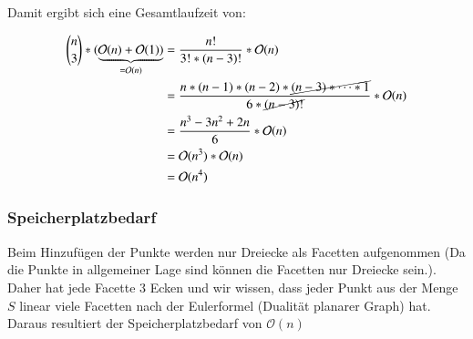 \documentclass[a4paper]{article}
\begin{document}
Damit ergibt sich eine Gesamtlaufzeit von:

\begin{align*}
\binom{n}{3} * (\underbrace{\mathcal{O}(n) + \mathcal{O}(1))}_{= \mathcal{O}(n)} &= 
\frac{n!}{3! * (n-3)!} * \mathcal{O}(n) \\
&= \frac{n * (n-1) * (n-2) * \cancel{(n-3) * \dots * 1}}{6 * \cancel{(n-3)!}} * \mathcal{O}(n) \\
&= \frac{n^3 - 3n^2 + 2n}{6} * \mathcal{O}(n) \\
&= \mathcal{O}(n^3) * \mathcal{O}(n) \\&= \mathcal{O}(n^4)
\end{align*}

\subsubsection*{Speicherplatzbedarf}
Beim Hinzufügen der Punkte werden nur Dreiecke als Facetten aufgenommen (Da die Punkte in allgemeiner Lage sind können die Facetten nur Dreiecke sein.). Daher hat jede Facette 3 Ecken und wir wissen, dass jeder Punkt aus der Menge $S$ linear viele Facetten nach der Eulerformel (Dualität planarer Graph) hat. Daraus resultiert der Speicherplatzbedarf von $\mathcal{O}(n)$
\end{document}
